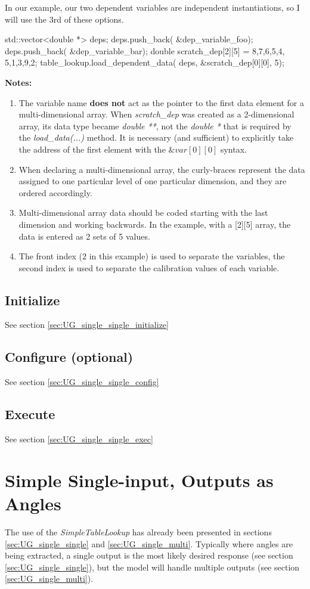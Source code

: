 \documentclass[11pt,fleqn]{report}
\begin{document}
In our example, our two dependent variables are independent instantiations,
so I will use the 3rd of these options.
\begin{code}
std::vector<double *> deps;
deps.push_back( &dep_variable_foo);
deps.push_back( &dep_variable_bar);
double scratch_dep[2][5] = {{8,7,6,5,4},
                            {5,1,3,9,2}};
table_lookup.load_dependent_data( deps,
                                  &scratch_dep[0][0],
                                  5);
\end{code}
\textbf{Notes:}
\begin{enumerate}
 \item The variable name \textbf{does not} act as the pointer to the first
 data element for a multi-dimensional array.  When \textit{scratch\_dep}
 was created
 as a 2-dimensional array, its data type became \textit{double **}, not the
 \textit{double *} that is required by the \textit{load\_data(...)} method.
 It is necessary (and sufficient) to explicitly
 take the address of the first element with the $\& var[0][0]$ syntax.
 \item When declaring a multi-dimensional array, the curly-braces represent
 the data assigned to one particular level of one particular dimension, and
 they are ordered accordingly.
\item Multi-dimensional array data should be coded starting with the last
 dimension and working backwards.
 In the example, with a [2][5] array, the data is entered as 2 sets of 5
 values.
\item The front index ($2$ in this example) is used to separate the variables,
the second index is used to separate the calibration values of each variable.
\end{enumerate}


\subsection{Initialize}
See section \ref{sec:UG_single_single_initialize}
\subsection{Configure (optional)}
See section \ref{sec:UG_single_single_config}
\subsection{Execute}
See section \ref{sec:UG_single_single_exec}


\section{Simple Single-input, Outputs as Angles}
 The use of the \textit{SimpleTableLookup} has already been presented in
 sections \ref{sec:UG_single_single} and \ref{sec:UG_single_multi}.
 Typically where angles are being extracted, a single output is the most likely
 desired response
 (see section \ref{sec:UG_single_single}), but the model will handle
 multiple outputs (see section \ref{sec:UG_single_multi}).
\end{document}
